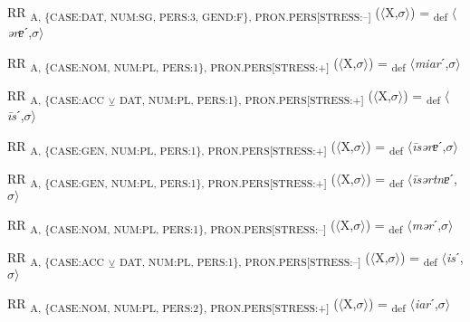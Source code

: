 {\begin{exe}
 RR \textsubscript{A, \{CASE:DAT, NUM:SG, PERS:3, GEND:F\}, PRON.PERS[STRESS:–]} ($\langle$X,$\sigma $$\rangle$) = \textsubscript{def} $\langle$\textit{ərɐ}ˊ,$\sigma $$\rangle$
\end{exe}

\begin{exe}
 RR \textsubscript{A, \{CASE:NOM, NUM:PL, PERS:1\}, PRON.PERS[STRESS:+]} ($\langle$X,$\sigma $$\rangle$) = \textsubscript{def} $\langle$\textit{miar}ˊ,$\sigma $$\rangle$
\end{exe}

\begin{exe}
 RR \textsubscript{A, \{CASE:ACC} \textsubscript{${\veebar}$}\textsubscript{ DAT, NUM:PL, PERS:1\}, PRON.PERS[STRESS:+]} ($\langle$X,$\sigma $$\rangle$) = \textsubscript{def} $\langle$\textit{\=is}ˊ,$\sigma $$\rangle$
\end{exe}

\begin{exe}
 RR \textsubscript{A, \{CASE:GEN, NUM:PL, PERS:1\}, PRON.PERS[STRESS:+]} ($\langle$X,$\sigma $$\rangle$) = \textsubscript{def} $\langle$\textit{\=isərɐ}ˊ,$\sigma $$\rangle$
\end{exe}

\begin{exe}
 RR \textsubscript{A, \{CASE:GEN, NUM:PL, PERS:1\}, PRON.PERS[STRESS:+]} ($\langle$X,$\sigma $$\rangle$) = \textsubscript{def} $\langle$\textit{\=isərtnɐ}ˊ,$\sigma $$\rangle$
\end{exe}

\begin{exe}
 RR \textsubscript{A, \{CASE:NOM, NUM:PL, PERS:1\}, PRON.PERS[STRESS:–]} ($\langle$X,$\sigma $$\rangle$) = \textsubscript{def} $\langle$\textit{mər}ˊ,$\sigma $$\rangle$
\end{exe}

\begin{exe}
 RR \textsubscript{A, \{CASE:ACC} \textsubscript{${\veebar}$}\textsubscript{ DAT, NUM:PL, PERS:1\}, PRON.PERS[STRESS:–]} ($\langle$X,$\sigma $$\rangle$) = \textsubscript{def} $\langle$\textit{is}ˊ,$\sigma $$\rangle$
\end{exe}

\begin{exe}
 RR \textsubscript{A, \{CASE:NOM, NUM:PL, PERS:2\}, PRON.PERS[STRESS:+]} ($\langle$X,$\sigma $$\rangle$) = \textsubscript{def} $\langle$\textit{iar}ˊ,$\sigma $$\rangle$
\end{exe}

}
